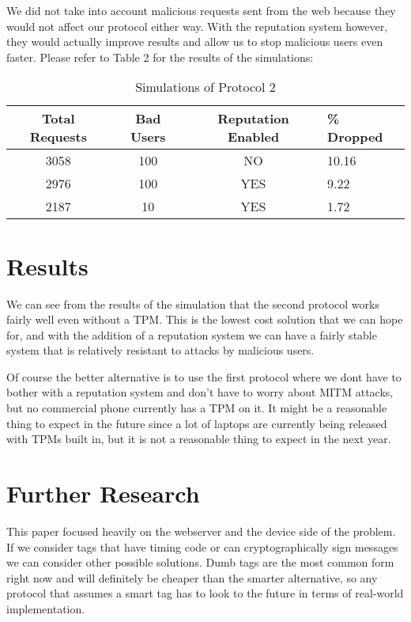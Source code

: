 \documentclass{sig-alternate}
\begin{document}
We did not take into account malicious requests sent from the web
because they would not affect our protocol either way. With the
reputation system however, they would actually improve results and
allow us to stop malicious users even faster. Please refer to Table 2
for the results of the simulations:

\begin{table}
\centering
\caption{Simulations of Protocol 2}
\begin{tabular}{|c|c|c|l|} \hline
Total Requests&Bad Users&Reputation Enabled&\% Dropped\\ \hline
3058&100&NO&10.16\\ \hline
2976&100&YES&9.22\\ \hline
2187&10&YES&1.72\\ \hline
\hline\end{tabular}
\end{table}

\section{Results}
We can see from the results of the simulation that the second protocol
works fairly well even without a TPM. This is the lowest cost solution
that we can hope for, and with the addition of a reputation system we
can have a fairly stable system that is relatively resistant to
attacks by malicious users.

Of course the better alternative is to use the first protocol where we
dont have to bother with a reputation system and don't have to worry
about MITM attacks, but no commercial phone currently has a TPM on
it. It might be a reasonable thing to expect in the future since a lot
of laptops are currently being released with TPMs built in, but it is
not a reasonable thing to expect in the next year.

\section{Further Research}
This paper focused heavily on the webserver and the device side of the
problem. If we consider tags that have timing code or can
cryptographically sign messages we can consider other possible
solutions. Dumb tags are the most common form right now and will
definitely be cheaper than the smarter alternative, so any protocol
that assumes a smart tag has to look to the future in terms of
real-world implementation.
\end{document}
